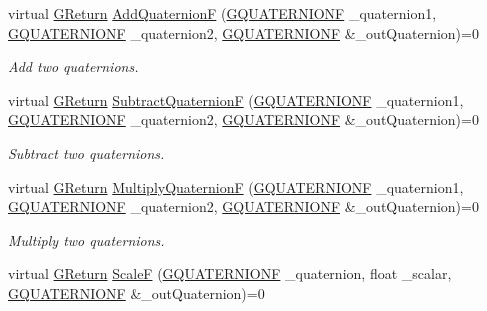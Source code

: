 \begin{DoxyCompactItemize}
\item 
virtual \hyperlink{namespaceGW_a67a839e3df7ea8a5c5686613a7a3de21}{G\+Return} \hyperlink{classGW_1_1MATH_1_1GQuaternion_a8022f790af2feae15bc99c753b5578fe}{Add\+QuaternionF} (\hyperlink{structGW_1_1MATH_1_1GQUATERNIONF}{G\+Q\+U\+A\+T\+E\+R\+N\+I\+O\+NF} \+\_\+quaternion1, \hyperlink{structGW_1_1MATH_1_1GQUATERNIONF}{G\+Q\+U\+A\+T\+E\+R\+N\+I\+O\+NF} \+\_\+quaternion2, \hyperlink{structGW_1_1MATH_1_1GQUATERNIONF}{G\+Q\+U\+A\+T\+E\+R\+N\+I\+O\+NF} \&\+\_\+out\+Quaternion)=0
\begin{DoxyCompactList}\small\item\em Add two quaternions. \end{DoxyCompactList}\item 
virtual \hyperlink{namespaceGW_a67a839e3df7ea8a5c5686613a7a3de21}{G\+Return} \hyperlink{classGW_1_1MATH_1_1GQuaternion_a73e2c8974e1b6b87624763e59b6af801}{Subtract\+QuaternionF} (\hyperlink{structGW_1_1MATH_1_1GQUATERNIONF}{G\+Q\+U\+A\+T\+E\+R\+N\+I\+O\+NF} \+\_\+quaternion1, \hyperlink{structGW_1_1MATH_1_1GQUATERNIONF}{G\+Q\+U\+A\+T\+E\+R\+N\+I\+O\+NF} \+\_\+quaternion2, \hyperlink{structGW_1_1MATH_1_1GQUATERNIONF}{G\+Q\+U\+A\+T\+E\+R\+N\+I\+O\+NF} \&\+\_\+out\+Quaternion)=0
\begin{DoxyCompactList}\small\item\em Subtract two quaternions. \end{DoxyCompactList}\item 
virtual \hyperlink{namespaceGW_a67a839e3df7ea8a5c5686613a7a3de21}{G\+Return} \hyperlink{classGW_1_1MATH_1_1GQuaternion_ad63c0c42b4c60910e40dbcedb497d4d0}{Multiply\+QuaternionF} (\hyperlink{structGW_1_1MATH_1_1GQUATERNIONF}{G\+Q\+U\+A\+T\+E\+R\+N\+I\+O\+NF} \+\_\+quaternion1, \hyperlink{structGW_1_1MATH_1_1GQUATERNIONF}{G\+Q\+U\+A\+T\+E\+R\+N\+I\+O\+NF} \+\_\+quaternion2, \hyperlink{structGW_1_1MATH_1_1GQUATERNIONF}{G\+Q\+U\+A\+T\+E\+R\+N\+I\+O\+NF} \&\+\_\+out\+Quaternion)=0
\begin{DoxyCompactList}\small\item\em Multiply two quaternions. \end{DoxyCompactList}\item 
virtual \hyperlink{namespaceGW_a67a839e3df7ea8a5c5686613a7a3de21}{G\+Return} \hyperlink{classGW_1_1MATH_1_1GQuaternion_ac807f57d533c019733a517566615516e}{ScaleF} (\hyperlink{structGW_1_1MATH_1_1GQUATERNIONF}{G\+Q\+U\+A\+T\+E\+R\+N\+I\+O\+NF} \+\_\+quaternion, float \+\_\+scalar, \hyperlink{structGW_1_1MATH_1_1GQUATERNIONF}{G\+Q\+U\+A\+T\+E\+R\+N\+I\+O\+NF} \&\+\_\+out\+Quaternion)=0

\end{DoxyCompactItemize}
